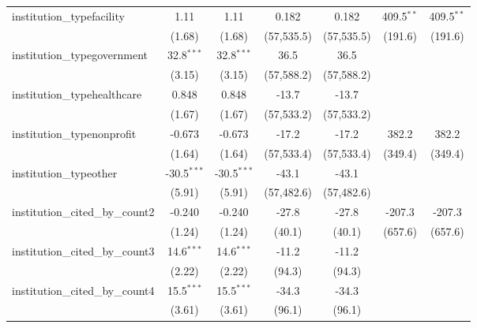\begin{tabular}{lcccccc}
   institution\_typefacility             & 1.11          & 1.11          & 0.182        & 0.182        & 409.5$^{**}$  & 409.5$^{**}$\\   
                                         & (1.68)        & (1.68)        & (57,535.5)   & (57,535.5)   & (191.6)       & (191.6)\\   
   institution\_typegovernment           & 32.8$^{***}$  & 32.8$^{***}$  & 36.5         & 36.5         &               &   \\   
                                         & (3.15)        & (3.15)        & (57,588.2)   & (57,588.2)   &               &   \\   
   institution\_typehealthcare           & 0.848         & 0.848         & -13.7        & -13.7        &               &   \\   
                                         & (1.67)        & (1.67)        & (57,533.2)   & (57,533.2)   &               &   \\   
   institution\_typenonprofit            & -0.673        & -0.673        & -17.2        & -17.2        & 382.2         & 382.2\\   
                                         & (1.64)        & (1.64)        & (57,533.4)   & (57,533.4)   & (349.4)       & (349.4)\\   
   institution\_typeother                & -30.5$^{***}$ & -30.5$^{***}$ & -43.1        & -43.1        &               &   \\   
                                         & (5.91)        & (5.91)        & (57,482.6)   & (57,482.6)   &               &   \\   
   institution\_cited\_by\_count2        & -0.240        & -0.240        & -27.8        & -27.8        & -207.3        & -207.3\\   
                                         & (1.24)        & (1.24)        & (40.1)       & (40.1)       & (657.6)       & (657.6)\\   
   institution\_cited\_by\_count3        & 14.6$^{***}$  & 14.6$^{***}$  & -11.2        & -11.2        &               &   \\   
                                         & (2.22)        & (2.22)        & (94.3)       & (94.3)       &               &   \\   
   institution\_cited\_by\_count4        & 15.5$^{***}$  & 15.5$^{***}$  & -34.3        & -34.3        &               &   \\   
                                         & (3.61)        & (3.61)        & (96.1)       & (96.1)       &               &   \\   

\end{tabular}
